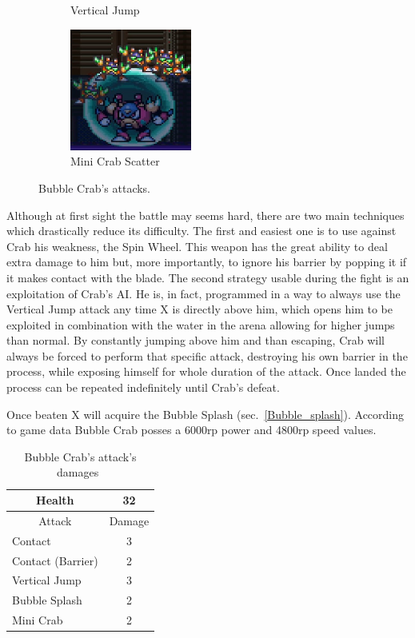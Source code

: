 \begin{figure}[htp]
\begin{subfigure}{0.40\linewidth}
	\caption{Vertical Jump}
	\end{subfigure}
	\begin{subfigure}{0.40\linewidth}
		\centering
		\includegraphics[height=4cm]{figures/X2/Bubble_crab/Crab_DM.png}
		\caption{Mini Crab Scatter}
	\end{subfigure}
	\caption{Bubble Crab's attacks.}	
\end{figure}
Although at first sight the battle may seems hard, there are two main techniques which drastically reduce its difficulty. The first and easiest one is to use against Crab his weakness, the Spin Wheel. This weapon has the great ability to deal extra damage to him but, more importantly, to ignore his barrier by popping it if it makes contact with the blade. The second strategy usable during the fight is an exploitation of Crab's AI. He is, in fact, programmed in a way to always use the Vertical Jump attack any time X is directly above him, which opens him to be exploited in combination with the water in the arena allowing for higher jumps than normal. By constantly jumping above him and than escaping, Crab will always be forced to perform that specific attack, destroying his own barrier in the process, while exposing himself for whole duration of the attack. Once landed the process can be repeated indefinitely until Crab's defeat.

Once beaten X will acquire the Bubble Splash (sec.~\ref{Bubble_splash}). According to game data Bubble Crab posses a 6000rp power and 4800rp speed values.

\begin{table}[htp]
	\centering
	\begin{tabular}[h]{l c}
		\toprule
		\multicolumn{1}{c}{Health}  & 32 \\
		\midrule
		\multicolumn{1}{c}{Attack} & \multicolumn{1}{c}{Damage}\\
		Contact & 3 \\
		Contact (Barrier) & 2\\
		Vertical Jump& 3\\
		Bubble Splash & 2\\
		Mini Crab & 2\\
		\bottomrule
	\end{tabular}
	\caption{Bubble Crab's attack's damages~\cite{wiki:Bubble_Crab}}
\end{table}

